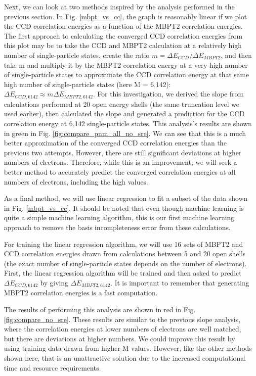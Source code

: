 Next, we can look at two methods inspired by the analysis performed in the previous section. In Fig. \ref{mbpt_vs_cc}, the graph is reasonably linear if we plot the CCD correlation energies as a function of the MBPT2 correlation energies. The first approach to calculating the converged CCD correlation energies from this plot may be to take the CCD and MBPT2 calculation at a relatively high number of single-particle states, create the ratio $m = \Delta E_{CCD}/\Delta E_{MBPT2}$, and then take m and multiply it by the MBPT2 correlation energy at a very high number of single-particle states to approximate the CCD correlation energy at that same high number of single-particle states (here M = 6,142): $\Delta E_{CCD, 6142} \approx m\Delta E_{MBPT2, 6142}$. For this investigation, we derived the slope from calculations performed at 20 open energy shells (the same truncation level we used earlier), then calculated the slope and generated a prediction for the CCD correlation energy at 6,142 single-particle states. This analysis's results are shown in green in Fig. \ref{fig:compare_pnm_all_no_sre}. We can see that this is a much better approximation of the converged CCD correlation energies than the previous two attempts. However, there are still significant deviations at higher numbers of electrons. Therefore, while this is an improvement, we will seek a better method to accurately predict the converged correlation energies at all numbers of electrons, including the high values.

As a final method, we will use linear regression to fit a subset of the data shown in Fig. \ref{mbpt_vs_cc}.  It should be noted that even though machine learning is quite a simple machine learning algorithm, this is our first machine learning approach to remove the basis incompleteness error from these calculations.

For training the linear regression algorithm, we will use 16 sets of MBPT2 and CCD correlation energies drawn from calculations between 5 and 20 open shells (the exact number of single-particle states depends on the number of electrons). First, the linear regression algorithm will be trained and then asked to predict $\Delta E_{CCD, 6142}$ by giving $\Delta E_{MBPT2,6142}$. It is important to remember that generating MBPT2 correlation energies is a fast computation.

The results of performing this analysis are shown in red in Fig. \ref{fig:compare_no_sre}. These results are similar to the previous slope analysis, where the correlation energies at lower numbers of electrons are well matched, but there are deviations at higher numbers. We could improve this result by using training data drawn from higher M values. However, like the other methods shown here, that is an unattractive solution due to the increased computational time and resource requirements.

